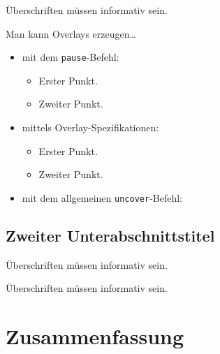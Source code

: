 \documentclass{beamer}
\begin{document}
\begin{frame}{Überschriften müssen informativ sein.}

  Man kann Overlays erzeugen\dots
  \begin{itemize}
  \item mit dem \texttt{pause}-Befehl:
    \begin{itemize}
    \item
      Erster Punkt.
      \pause
    \item    
      Zweiter Punkt.
    \end{itemize}
  \item
    mittels Overlay-Spezifikationen:
    \begin{itemize}
    \item<3->
      Erster Punkt.
    \item<4->
      Zweiter Punkt.
    \end{itemize}
  \item
    mit dem allgemeinen \texttt{uncover}-Befehl:
    \begin{itemize}
    \end{itemize}
  \end{itemize}
\end{frame}


\subsection{Zweiter Unterabschnittstitel}

\begin{frame}{Überschriften müssen informativ sein.}
\end{frame}

\begin{frame}{Überschriften müssen informativ sein.}
\end{frame}

\section*{Zusammenfassung}
\end{document}
